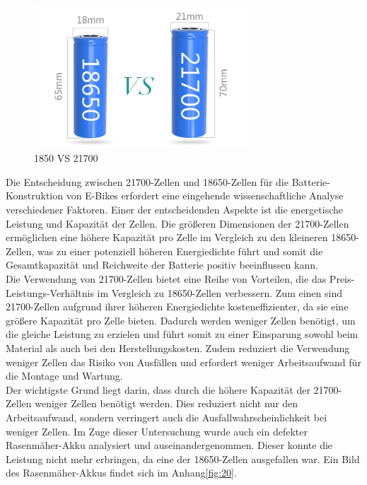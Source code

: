 \begin{figure}[h]
    \centering
    \includegraphics[width=8cm]{images/18650-VS-21700.jpg}
    \caption{1850 VS 21700\cite{Tritek.12132021}}
    \label{fig:1850VS21700}
\end{figure}



Die Entscheidung zwischen 21700-Zellen und 18650-Zellen für die Batterie-Konstruktion von E-Bikes erfordert eine eingehende wissenschaftliche Analyse verschiedener Faktoren.
Einer der entscheidenden Aspekte ist die energetische Leistung und Kapazität der Zellen.
Die größeren Dimensionen der 21700-Zellen ermöglichen eine höhere Kapazität pro Zelle im Vergleich zu den kleineren 18650-Zellen, was zu einer potenziell höheren Energiedichte führt und somit die Gesamtkapazität und Reichweite der Batterie positiv beeinflussen kann.\\

Die Verwendung von 21700-Zellen bietet eine Reihe von Vorteilen, die das Preis-Leistungs-Verhältnis im Vergleich zu 18650-Zellen verbessern.
Zum einen sind 21700-Zellen aufgrund ihrer höheren Energiedichte kosteneffizienter, da sie eine größere Kapazität pro Zelle bieten.
Dadurch werden weniger Zellen benötigt, um die gleiche Leistung zu erzielen und führt somit zu einer Einsparung sowohl beim Material als auch bei den Herstellungskosten.
Zudem reduziert die Verwendung weniger Zellen das Risiko von Ausfällen und erfordert weniger Arbeitsaufwand für die Montage und Wartung.\\



Der wichtigste Grund liegt darin, dass durch die höhere Kapazität der 21700-Zellen weniger Zellen benötigt werden.
Dies reduziert nicht nur den Arbeitsaufwand, sondern verringert auch die Ausfallwahrscheinlichkeit bei weniger Zellen.
Im Zuge dieser Untersuchung wurde auch ein defekter Rasenmäher-Akku analysiert und auseinandergenommen.
Dieser konnte die Leistung nicht mehr erbringen, da eine der 18650-Zellen ausgefallen war.
Ein Bild des Rasenmäher-Akkus findet sich im Anhang\ref{fig:20}.\\

